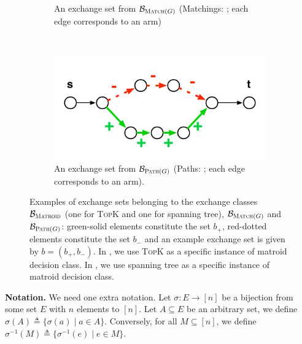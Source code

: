 \documentclass{article}
\newcommand{\B}{\mathcal B}
\newcommand{\MultiIdent}{\textsc{TopK}\xspace}
\newcommand{\Matroid}{\textsc{Matroid}\xspace}
\newcommand{\Match}{\textsc{Match}\xspace}
\newcommand{\Path}{\textsc{Path}\xspace}
\begin{document}
\begin{figure}[ht]
\begin{subfigure}[c]{0.45\textwidth}
	\caption{An exchange set from $\B_{\Match(G)}$ (Matchings: ; each edge corresponds to an arm) }
\end{subfigure}
~
\begin{subfigure}[c]{0.45\textwidth}
	\includegraphics[width=\textwidth]{fig/exchange-path}
	\caption{An exchange set from $\B_{\Path(G)}$ (Paths: ; each edge corresponds to an arm).}
\end{subfigure}
\caption{
Examples of exchange sets belonging to the exchange classes $\B_{\Matroid}$ (one for \MultiIdent and one for spanning tree), $\B_{\Match(G)}$ and $\B_{\Path(G)}$:
green-solid elements constitute the set $b_+$, red-dotted elements constitute the set $b_-$ and an example exchange set is given by $b=(b_+,b_-)$. 
In , we use \MultiIdent as a specific instance of matroid decision class.
In , we use spanning tree as a specific instance of matroid decision class.
}
\label{fig:exchange}
\end{figure}

\textbf{Notation.} We need one extra notation.
Let $\sigma: E\rightarrow [n]$ be a bijection from some set $E$ with $n$ elements to $[n]$.
Let $A\subseteq E$ be an arbitrary set, we define $\sigma(A) \triangleq \{\sigma(a) \mid  a\in A\}$.
Conversely, for all $M\subseteq[n]$, we define $\sigma^{-1}(M) \triangleq \{\sigma^{-1}(e) \mid e\in M\}$.
\end{document}
